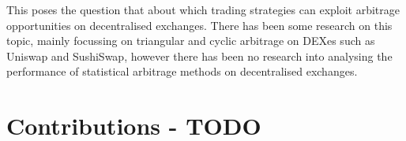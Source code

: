 This poses the question that about which trading strategies can exploit arbitrage opportunities on decentralised exchanges. There has been some research on this topic, mainly focussing on triangular and cyclic arbitrage on DEXes such as Uniswap and SushiSwap, however there has been no research into analysing the performance of statistical arbitrage methods on decentralised exchanges.




\section{Contributions - TODO}